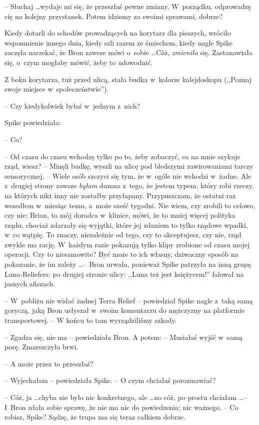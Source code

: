 \documentclass[oneside,polish,11pt,rmheadings]{mwbk}
\begin{document}
-- Słuchaj \ldots   wydaje mi się, że przeszłaś pewne zmiany. W~porządku, odprowadzę cię na kolejny przystanek. Potem idziemy za swoimi sprawami, dobrze? 

Kiedy dotarli do schodów prowadzących na korytarz dla pieszych, wróciło wspomnienie innego dnia, kiedy szli razem ze śmiechem, kiedy nagle Spike zaczęła narzekać, że Bron zawsze mówi o~sobie \ldots  Cóż, \textit{zmieniła }się. Zastanawiała się, o~czym mogłaby mówić, żeby to udowodnić. 

Z boku korytarza, tuż przed ulicą, stała budka w~kolorze kalejdoskopu (,,Poznaj swoje miejsce w~społeczeństwie'').

 -- Czy kiedykolwiek byłaś w~jednym z~nich?  

Spike powiedziała: 

-- Co? 

-- Od czasu do czasu wchodzę tylko po to, żeby zobaczyć, co na mnie szykuje rząd, wiesz? -- Minęli budkę, wyszli na ulicę pod bledszymi zawirowaniami tarczy sensorycznej. -- Wiele osób szczyci się tym, że w~ogóle nie wchodzi w~żadne. Ale z~drugiej strony zawsze \textit{byłam }dumna z~tego, że jestem typem, który robi rzeczy, na których nikt inny nie zostałby przyłapany. Przypuszczam, że ostatni raz wszedłem w~miesiąc temu, a~może sześć tygodni. Nie wiem, czy zrobili to celowo, czy nie; Brian, to mój doradca w~klinice, mówi, że to mniej więcej polityka rządu, chociaż zdarzały się wyjątki, które jej zdaniem to tylko rządowe wpadki, w~co wątpię. To znaczy, niezależnie od tego, czy to akceptujesz, czy nie, rząd zwykle ma rację. W~każdym razie pokazują tylko klipy zrobione od czasu mojej operacji. Czy to niesamowite? Być może to ich własny, dziwaczny sposób na pokazanie, że im zależy \ldots  -- Bron urwała, ponieważ Spike patrzyła na inną grupę Luna-Reliefers: po drugiej stronie ulicy: ,,Luna też jest księżycem!'' falował na jasnych afiszach. 


-- W~pobliżu nie widać żadnej Terra Relief -- powiedział Spike nagle z~taką samą goryczą, jaką Bron usłyszał w~swoim komentarzu do mężczyzny na platformie transportowej. -- W końcu to tam wyrządziliśmy szkody. 

-- Zgadza się, nie ma -- powiedziała Bron. A potem: -- Musiałaś wyjść w~samą porę. Zmarszczyła brwi. 

-- A może przez to przeszłaś?

-- Wyjechałam -- powiedziała Spike. -- O czym chciałaś porozmawiać? 

-- Cóż, ja \ldots  chyba nie było nic konkretnego, ale \ldots  no cóż, po prostu chciałam \ldots  -- I~Bron zdała sobie sprawę, że nie ma nic do powiedzenia; nic ważnego. -- Co robisz, Spike? Sądzę, że trupa ma się teraz całkiem dobrze. 
\end{document}
